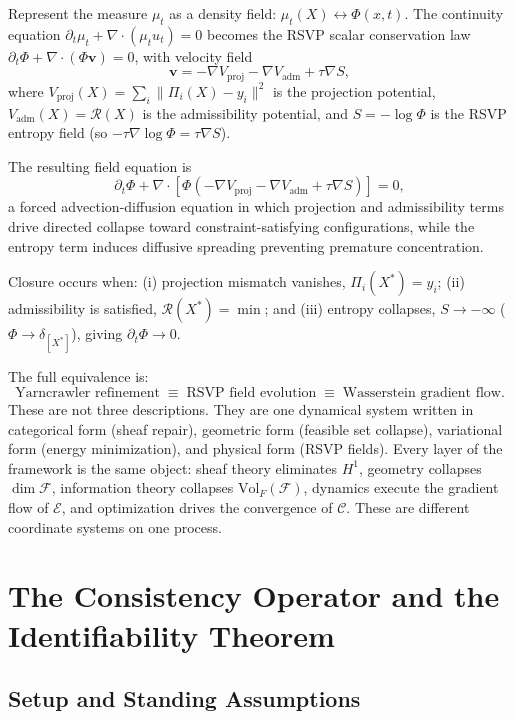 \documentclass[11pt, oneside]{article}
\begin{document}
Represent the measure $\mu_t$ as a density field: $\mu_t(X) \leftrightarrow \Phi(x,t)$.
The continuity equation $\partial_t \mu_t + \nabla\cdot(\mu_t u_t) = 0$ becomes the
RSVP scalar conservation law $\partial_t \Phi + \nabla\cdot(\Phi\mathbf{v}) = 0$,
with velocity field
\[
\mathbf{v} = -\nabla V_{\mathrm{proj}} - \nabla V_{\mathrm{adm}} + \tau \nabla S,
\]
where $V_{\mathrm{proj}}(X) = \sum_i \|\Pi_i(X) - y_i\|^2$ is the projection potential,
$V_{\mathrm{adm}}(X) = \mathcal{R}(X)$ is the admissibility potential, and
$S = -\log\Phi$ is the RSVP entropy field (so $-\tau\nabla\log\Phi = \tau\nabla S$).

The resulting field equation is
\[
\partial_t \Phi + \nabla\cdot\!\left[
\Phi\!\left(-\nabla V_{\mathrm{proj}} - \nabla V_{\mathrm{adm}} + \tau\nabla S\right)
\right] = 0,
\]
a forced advection-diffusion equation in which projection and admissibility terms drive
directed collapse toward constraint-satisfying configurations, while the entropy term
induces diffusive spreading preventing premature concentration.

Closure occurs when: (i) projection mismatch vanishes, $\Pi_i(X^*) = y_i$; (ii)
admissibility is satisfied, $\mathcal{R}(X^*) = \min$; and (iii) entropy collapses,
$S \to -\infty$ ($\Phi \to \delta_{[X^*]}$), giving $\partial_t\Phi \to 0$.

The full equivalence is:
\[
\text{Yarncrawler refinement}
\;\equiv\;
\text{RSVP field evolution}
\;\equiv\;
\text{Wasserstein gradient flow.}
\]
These are not three descriptions. They are one dynamical system written in categorical
form (sheaf repair), geometric form (feasible set collapse), variational form (energy
minimization), and physical form (RSVP fields). Every layer of the framework is the same
object: sheaf theory eliminates $H^1$, geometry collapses $\dim\mathcal{F}$, information
theory collapses $\mathrm{Vol}_F(\mathcal{F})$, dynamics execute the gradient flow of
$\mathcal{E}$, and optimization drives the convergence of $\mathcal{C}$. These are
different coordinate systems on one process.

\section{The Consistency Operator and the Identifiability Theorem}
\label{sec:identifiability}

\subsection{Setup and Standing Assumptions}
\end{document}
